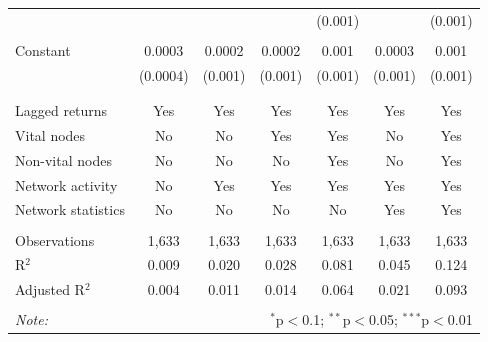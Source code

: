 \begin{table}[!htbp]
\begin{tabular}{@{\extracolsep{5pt}}lcccccc}
 &  &  &  & (0.001) &  & (0.001) \\ 
 & & & & & & \\ 
 Constant & 0.0003 & 0.0002 & 0.0002 & 0.001 & 0.0003 & 0.001 \\ 
 & (0.0004) & (0.001) & (0.001) & (0.001) & (0.001) & (0.001) \\ 
  & & & & & & \\ 
\hline \\[-1.8ex] 
Lagged returns & Yes & Yes & Yes & Yes & Yes & Yes \\ 
Vital nodes & No & No & Yes & Yes & No & Yes \\ 
Non-vital nodes & No & No & No & Yes & No & Yes \\ 
Network activity & No & Yes & Yes & Yes & Yes & Yes \\ 
Network statistics & No & No & No & No & Yes & Yes \\ 
\hline &  &  &  &  &  &  \\ 
Observations & 1,633 & 1,633 & 1,633 & 1,633 & 1,633 & 1,633 \\ 
R$^{2}$ & 0.009 & 0.020 & 0.028 & 0.081 & 0.045 & 0.124 \\ 
Adjusted R$^{2}$ & 0.004 & 0.011 & 0.014 & 0.064 & 0.021 & 0.093 \\ 
\hline 
\hline \\[-1.8ex] 
\textit{Note:}  & \multicolumn{6}{r}{$^{*}$p$<$0.1; $^{**}$p$<$0.05; $^{***}$p$<$0.01} \\ 
\end{tabular} 
\end{table} 
